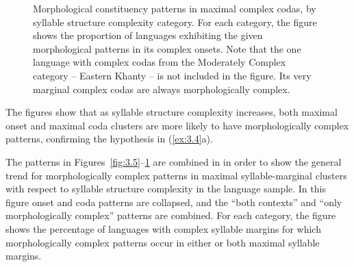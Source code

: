 \begin{figure}
\caption{\label{fig:3.6} Morphological constituency patterns in maximal complex codas, by syllable structure complexity category. For each category, the figure shows the proportion of languages exhibiting the given morphological patterns in its complex onsets. Note that the one language with complex codas from the Moderately Complex category -- Eastern Khanty -- is not included in the figure. Its very marginal complex codas are always morphologically complex.}
\end{figure}


  The figures show that as syllable structure complexity increases, both maximal onset and maximal coda clusters are more likely to have morphologically complex patterns, confirming the hypothesis in (\ref{ex:3.4}a).

  The patterns in Figures~\ref{fig:3.5}--\ref{fig:3.6} are combined in  in order to show the general trend for morphologically complex patterns in maximal syllable-mar\-gin\-al clusters with respect to syllable structure complexity in the language sample. In this figure onset and coda patterns are collapsed, and the “both contexts” and “only morphologically complex” patterns are combined. For each category, the figure shows the percentage of languages with complex syllable margins for which morphologically complex patterns occur in either or both maximal syllable margins.


